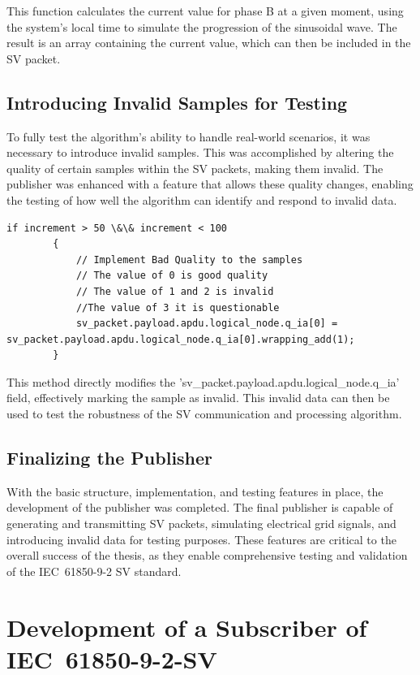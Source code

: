 	This function calculates the current value for phase B at a given moment, using the system's local time to simulate the progression of the sinusoidal wave. The result is an array containing the current value, which can then be included in the SV packet.
	
	\subsection{Introducing Invalid Samples for Testing}
	
	To fully test the algorithm's ability to handle real-world scenarios, it was necessary to introduce invalid samples. This was accomplished by altering the quality of certain samples within the SV packets, making them invalid. The publisher was enhanced with a feature that allows these quality changes, enabling the testing of how well the algorithm can identify and respond to invalid data.
	
	\begin{lstlisting}[caption={How to calculate the value of the SV's }]
		if increment > 50 \&\& increment < 100
		{
			// Implement Bad Quality to the samples
			// The value of 0 is good quality
			// The value of 1 and 2 is invalid
			//The value of 3 it is questionable
			sv_packet.payload.apdu.logical_node.q_ia[0] = sv_packet.payload.apdu.logical_node.q_ia[0].wrapping_add(1);	
		}
	\end{lstlisting}
	
	This method directly modifies the 'sv\_packet.payload.apdu.logical\_node.q\_ia' field, effectively marking the sample as invalid. This invalid data can then be used to test the robustness of the SV communication and processing algorithm.
	
	\subsection{Finalizing the Publisher}
	
	With the basic structure, implementation, and testing features in place, the development of the publisher was completed. The final publisher is capable of generating and transmitting SV packets, simulating electrical grid signals, and introducing invalid data for testing purposes. These features are critical to the overall success of the thesis, as they enable comprehensive testing and validation of the IEC~61850-9-2 SV standard.
	
	\section{Development of a Subscriber of IEC~61850-9-2-SV}
	
